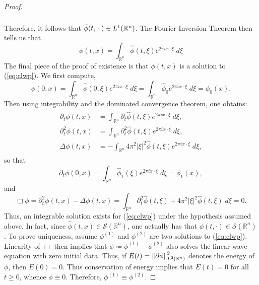 \documentclass{article}
\begin{document}
\begin{proof}
\begin{align*}
\begin{split}
	\end{split} 
\end{align*}
Therefore, it follows that $\hat{\phi}(t, \hspace{2pt}\cdot\hspace{2pt}) \in L^{1}(\mathbb{R}^{n})$. The Fourier Inversion Theorem then tells us that 
\begin{equation*}
	\phi(t, x) = \int_{\mathbb{R}^{n}}\hat{\phi}(t, \xi)e^{2\pi i x \cdot \xi}\;d\xi 
\end{equation*}
The final piece of the proof of existence is that $\phi(t, x)$ is a solution to (\ref{eq:clwp}). We first compute, 
\begin{equation*}
	\phi(0,x) = \int_{\mathbb{R}^{n}}\hat{\phi}(0, \xi)e^{2\pi i x \cdot \xi}\;d\xi = \int_{\mathbb{R}^{n}}\hat{\phi}_{0}e^{2\pi i x \cdot \xi}\;d\xi = \phi_{0}(x). 	
\end{equation*}
Then using integrability and the dominated convergence theorem, one obtains: 
\begin{align*}
	\begin{split}
		\partial_{t}\phi(t, x) &= \int_{\mathbb{R}^{n}}\partial_{t}\hat{\phi}(t, \xi)e^{2\pi i x \cdot \xi}\;d\xi, \\
		\partial_{t}^{2}\phi(t, x) &= \int_{\mathbb{R}^{n}}\partial_{t}^{2}\hat{\phi}(t, \xi)e^{2\pi i x \cdot \xi}\;d\xi, \\
		\Delta \phi(t, x) &= -\int_{\mathbb{R}^{n}}4\pi^{2}|\xi|^{2}\hat{\phi}(t, \xi)e^{2\pi i x \cdot \xi}\;d\xi,  
	\end{split}
\end{align*}
so that 
\begin{equation*}
	\partial_{t}\phi(0,x) = \int_{\mathbb{R}^{n}}\hat{\phi}_{1}(\xi)e^{2\pi i x \cdot \xi}\;d\xi = \phi_{1}(x), 
\end{equation*}
and 
\begin{equation*}
	\Box \phi = \partial_{t}^{2}\phi(t,x) - \Delta \phi(t, x) = \int_{\mathbb{R}^{n}}\partial_{t}^{2}\hat{\phi}(t, \xi) + 4\pi^{2}|\xi|^{2}\hat{\phi}(t, \xi)\;d\xi = 0. 
\end{equation*}
Thus, an integrable solution exists for (\ref{eq:clwp}) under the hypothesis assumed above. In fact, since $\hat{\phi}(t, x) \in \mathcal{S}(\mathbb{R}^{n})$, one actually has that $\phi(t, \cdot) \in \mathcal{S}(\mathbb{R}^{n})$. To prove uniqueness, assume $\phi^{(1)}$ and $\phi^{(2)}$ are two solutions to (\ref{eq:clwp}). Linearity of $\Box$ then implies that $\phi \coloneqq \phi^{(1)} - \phi^{(2)}$ also solves the linear wave equation with zero initial data. Thus, if $E(t) = \left\Vert \partial \phi \right\Vert_{L^{2}(\mathbb{R}^{n})}^{2}$ denotes the energy of $\phi$, then $E(0) = 0$. Thus conservation of energy implies that $E(t) = 0$ for all $t \geq 0$, whence $\phi \equiv 0$. Therefore, $\phi^{(1)} \equiv \phi^{(2)}$. 
\end{proof}
\end{document}
